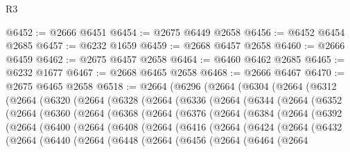 \begin{lexlean}{R3}
\begin{coremodule}
@6452 := @2666 @6451
@6454 := @2675 @6449 @2658
@6456 := @6452 @6454 @2685
@6457 := @6232 @1659
@6459 := @2668 @6457 @2658
@6460 := @2666 @6459
@6462 := @2675 @6457 @2658
@6464 := @6460 @6462 @2685
@6465 := @6232 @1677
@6467 := @2668 @6465 @2658
@6468 := @2666 @6467
@6470 := @2675 @6465 @2658
@6518 := @2664
    (@6296
      (@2664
        (@6304
          (@2664
            (@6312
              (@2664
                (@6320
                  (@2664
                    (@6328
                      (@2664
                        (@6336
                          (@2664
                            (@6344
                              (@2664
                                (@6352
                                  (@2664
                                    (@6360
                                      (@2664
                                        (@6368
                                          (@2664
                                            (@6376
                                              (@2664
                                                (@6384
                                                  (@2664
                                                    (@6392
                                                      (@2664
                                                        (@6400
                                                          (@2664
                                                            (@6408
                                                              (@2664
                                                                (@6416
                                                                  (@2664
                                                                    (@6424
                                                                      (@2664
                                                                        (@6432
                                                                          (@2664
                                                                            (@6440
                                                                              (@2664
                                                                                (@6448
                                                                                  (@2664
                                                                                    (@6456
                                                                                      (@2664
                                                                                        (@6464
                                                                                          (@2664

\end{coremodule}
\end{lexlean}
